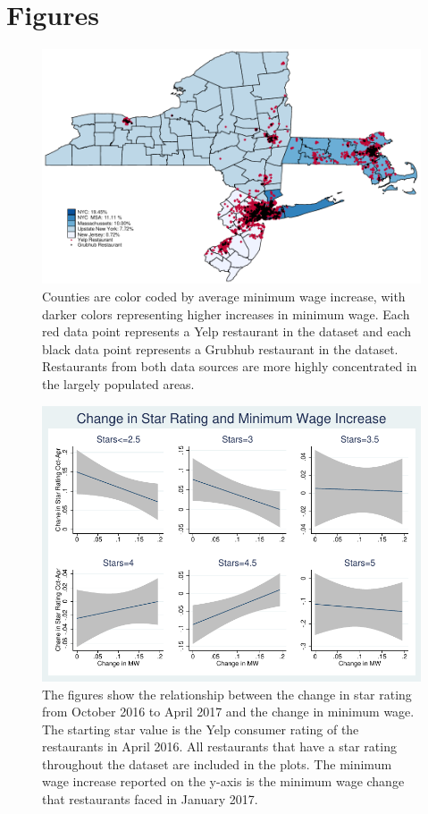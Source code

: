 \documentclass[11pt]{article}
\begin{document}
\newpage


%


\newpage


\section{Figures}

\begin{figure}[H]
\centering
\includegraphics[scale=1]{map_yelp.pdf}
\caption[Short Heading]{
Counties are color coded by average minimum wage increase, with darker colors representing higher increases in minimum wage. Each red data point represents a Yelp restaurant in the dataset and each black data point represents a Grubhub restaurant in the dataset. Restaurants from both data sources are more highly concentrated in the largely populated areas. 
}
\end{figure}

\begin{figure}[H]
\centering
\includegraphics[scale=.75]{stars_lfits.pdf}
\caption[Short Heading]{
The figures show the relationship between the change in star rating from October 2016 to April 2017 and the change in minimum wage. The starting star value is the Yelp consumer rating of the restaurants in April 2016. All restaurants that have a star rating throughout the dataset are included in the plots. The minimum wage increase reported on the y-axis is the minimum wage change that restaurants faced in January 2017.
}
\end{figure}
\end{document}

